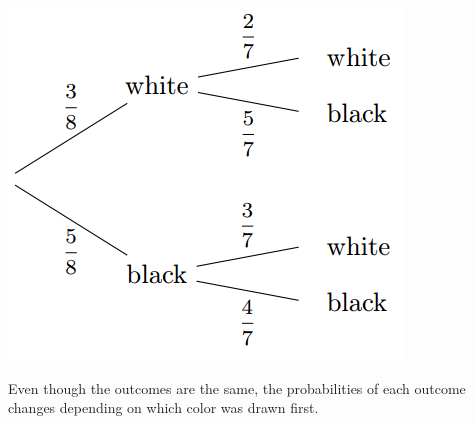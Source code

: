 \documentclass{ximera}
\begin{document}
\begin{image}
\includegraphics{ProbTree2.png}
\end{image}

Even though the outcomes are the same, the probabilities of each outcome changes depending on which color was drawn first.
\end{document}
